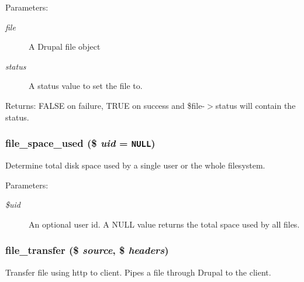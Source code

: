 \begin{Desc}
\item[Parameters:]
\begin{description}
\item[{\em file}]A Drupal file object \item[{\em status}]A status value to set the file to. \end{description}
\end{Desc}
\begin{Desc}
\item[Returns:]FALSE on failure, TRUE on success and \$file-$>$status will contain the status. \end{Desc}
\hypertarget{group__file_g1cffb160754bb1704ab2c773a7c1ffb4}{
\subsubsection[{file\_\-space\_\-used}]{\setlength{\rightskip}{0pt plus 5cm}file\_\-space\_\-used (\$ {\em uid} = {\tt NULL})}}
\label{group__file_g1cffb160754bb1704ab2c773a7c1ffb4}


Determine total disk space used by a single user or the whole filesystem.

\begin{Desc}
\item[Parameters:]
\begin{description}
\item[{\em \$uid}]An optional user id. A NULL value returns the total space used by all files. \end{description}
\end{Desc}
\hypertarget{group__file_g33925d82d6b6057e73ae7853f1be7125}{
\subsubsection[{file\_\-transfer}]{\setlength{\rightskip}{0pt plus 5cm}file\_\-transfer (\$ {\em source}, \/  \$ {\em headers})}}
\label{group__file_g33925d82d6b6057e73ae7853f1be7125}


Transfer file using http to client. Pipes a file through Drupal to the client.

